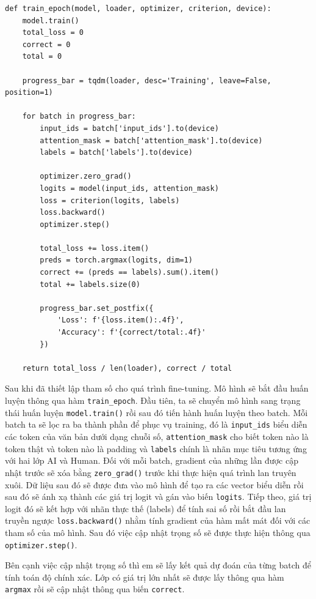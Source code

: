 \begin{lstlisting}[style=pythoncode]
def train_epoch(model, loader, optimizer, criterion, device):
    model.train()
    total_loss = 0
    correct = 0
    total = 0

    progress_bar = tqdm(loader, desc='Training', leave=False, position=1)

    for batch in progress_bar:
        input_ids = batch['input_ids'].to(device)
        attention_mask = batch['attention_mask'].to(device)
        labels = batch['labels'].to(device)

        optimizer.zero_grad()
        logits = model(input_ids, attention_mask)
        loss = criterion(logits, labels)
        loss.backward()
        optimizer.step()

        total_loss += loss.item()
        preds = torch.argmax(logits, dim=1)
        correct += (preds == labels).sum().item()
        total += labels.size(0)

        progress_bar.set_postfix({
            'Loss': f'{loss.item():.4f}',
            'Accuracy': f'{correct/total:.4f}'
        })

    return total_loss / len(loader), correct / total
\end{lstlisting}

Sau khi đã thiết lập tham số cho quá trình fine-tuning. Mô hình sẽ bắt đầu huấn luyện thông qua hàm \texttt{train\_epoch}. Đầu tiên, ta sẽ chuyển mô hình sang trạng thái huấn luyện \texttt{model.train()} rồi sau đó tiến hành
huấn luyện theo batch. Mỗi batch ta sẽ lọc ra ba thành phần để phục vụ training, đó là \texttt{input\_ids} biểu diễn các token của văn bản dưới dạng chuỗi số, \texttt{attention\_mask} cho biết token nào là token thật và 
token nào là padding và \texttt{labels} chính là nhãn mục tiêu tương ứng với hai lớp AI và Human. Đối với mỗi batch, gradient của những lần được cập nhật trước sẽ xóa bằng \texttt{zero\_grad()} trước khi thực hiện quá trình lan
truyên xuôi. Dữ liệu sau đó sẽ được đưa vào mô hình để tạo ra các vector biểu diễn rồi sau đó sẽ ánh xạ thành các giá trị logit và gán vào biến \texttt{logits}. Tiếp theo, giá trị logit đó sẽ kết hợp với nhãn thực thế (labels) để
tính sai số rồi bắt đầu lan truyền ngược \texttt{loss.backward()} nhằm tính gradient của hàm mất mát đối với các tham số của mô hình. Sau đó việc cập nhật trọng số sẽ được thực hiện thông qua \texttt{optimizer.step()}.

\vspace{\baselineskip}
\noindent
Bên cạnh việc cập nhật trọng số thì em sẽ lấy kết quả dự đoán của từng batch để tính toán độ chính xác. Lớp có giá trị lớn nhất sẽ được lấy thông qua hàm \texttt{argmax} rồi sẽ cập nhật thông qua biến \texttt{correct}.

